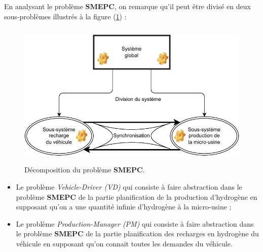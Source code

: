 En analysant le problème \textbf{SMEPC}, on remarque qu'il peut être divisé en deux sous-problèmes illustrés à la figure (\ref{synchronisation pb}) :

\begin{figure}[H]
	\centerline{
		\includegraphics[height=7cm]{images_these/synchronisation_pb.pdf}}
	\caption[Décomposition du prolème SMEPC]{Décomposition du problème \textbf{SMEPC}.}
	\label{synchronisation pb}
\end{figure}
\begin{itemize}[label=$\square$]
	\item Le problème \textit{Vehicle-Driver (VD)} qui consiste à faire abstraction dans le problème \textbf{SMEPC} de la partie planification de la production d'hydrogène en supposant qu'on a une quantité infinie d'hydrogène à la micro-usine ;
	
	\item Le problème \textit{Production-Manager (PM)} qui consiste à faire abstraction dans le problème \textbf{SMEPC} de la partie planification des recharges en hydrogène du véhicule en supposant qu'on connait toutes les demandes du véhicule.
\end{itemize}

